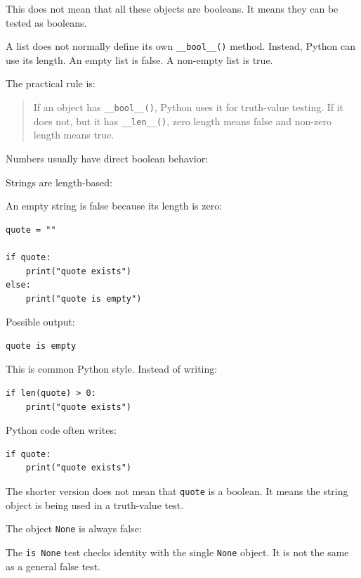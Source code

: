 This does not mean that all these objects are booleans. It means they can be tested as booleans.

A list does not normally define its own \texttt{\_\_bool\_\_()} method. Instead, Python can use its length. An empty list is false. A non-empty list is true.

The practical rule is:

\begin{quote}
If an object has \texttt{\_\_bool\_\_()}, Python uses it for truth-value testing. If it does not, but it has \texttt{\_\_len\_\_()}, zero length means false and non-zero length means true.
\end{quote}

Numbers usually have direct boolean behavior:

Strings are length-based:

An empty string is false because its length is zero:

\begin{verbatim}
quote = ""

if quote:
    print("quote exists")
else:
    print("quote is empty")
\end{verbatim}

Possible output:

\begin{verbatim}
quote is empty
\end{verbatim}

This is common Python style. Instead of writing:

\begin{verbatim}
if len(quote) > 0:
    print("quote exists")
\end{verbatim}

Python code often writes:

\begin{verbatim}
if quote:
    print("quote exists")
\end{verbatim}

The shorter version does not mean that \texttt{quote} is a boolean. It means the string object is being used in a truth-value test.

The object \texttt{None} is always false:

The \texttt{is None} test checks identity with the single \texttt{None} object. It is not the same as a general false test.

